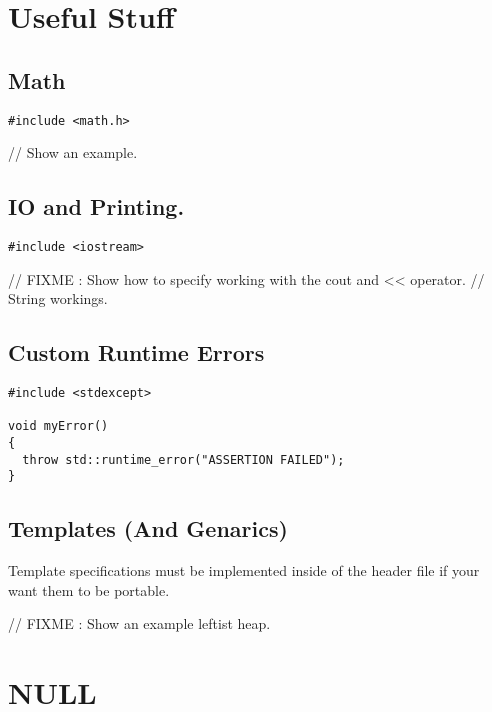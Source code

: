 \documentclass[12pt, letterpaper]{article}
\begin{document}
\section{Useful Stuff}

\subsection{Math}

\begin{verbatim}
#include <math.h>
\end{verbatim}

// Show an example.

\subsection{IO and Printing.}

\begin{verbatim}
#include <iostream>

\end{verbatim}

// FIXME : Show how to specify working with the cout and << operator.
// String workings.

\subsection{Custom Runtime Errors}

\begin{verbatim}
#include <stdexcept>

void myError()
{
  throw std::runtime_error("ASSERTION FAILED");
}

\end{verbatim}

\subsection{Templates (And Genarics)}

Template specifications must be implemented inside of the header file if your want them to be portable.

// FIXME : Show an example leftist heap.

\section{NULL}

\end{document}
